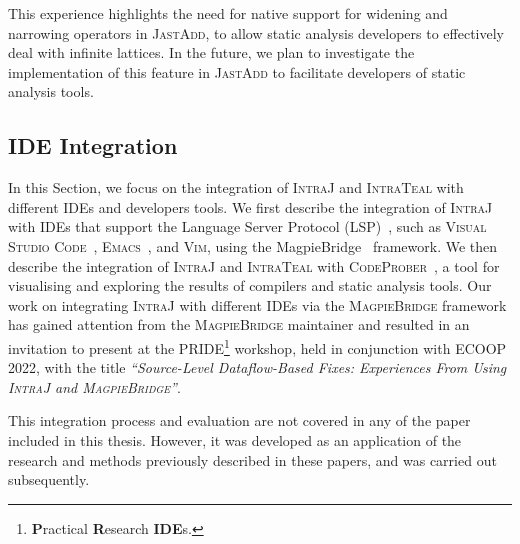 This experience highlights the need for native support for widening and narrowing
operators in \textsc{JastAdd}, to allow static analysis developers to effectively deal with
infinite lattices. In the future, we plan to investigate the implementation of this
feature in \textsc{JastAdd} to facilitate developers of static analysis tools.


\subsection{IDE Integration}
In this Section, we focus on the integration of \textsc{IntraJ} and \textsc{IntraTeal} with different
IDEs and developers tools. We first describe the integration of \textsc{IntraJ} with
IDEs that support the Language Server Protocol (LSP)~\cite{lsp}, such as
\textsc{Visual Studio Code}~\cite{vscode}, \textsc{Emacs}~\cite{emacs}, and \textsc{Vim}\cite{vim}, using
the MagpieBridge~\cite{luo_et_al:LIPIcs:2019:10813} framework. We then describe the
integration of \textsc{IntraJ} and \textsc{IntraTeal} with \textsc{CodeProber}~\cite{risberg2022property},
a tool for visualising and exploring the results of compilers and static analysis tools.
Our work on integrating \textsc{IntraJ} with different IDEs via the \textsc{MagpieBridge}
framework has gained attention from the \textsc{MagpieBridge} maintainer and resulted in an invitation
to present at the \textsc{PRIDE}\footnote{\textbf{P}ractical \textbf{R}esearch \textbf{IDE}s.} workshop, held in conjunction with \textsc{ECOOP 2022}, with the
title \emph{``Source-Level Dataflow-Based Fixes: Experiences From Using \textsc{IntraJ} and \textsc{MagpieBridge}''}.

This integration process and evaluation are not covered in any of the paper included in this thesis.
However, it was developed as an application of the research and methods previously
described in these papers, and was carried out subsequently.


